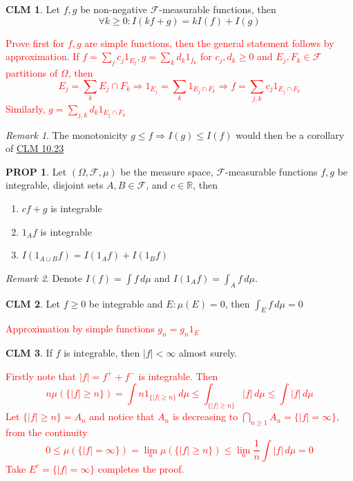 \documentclass[hidelinks]{article}
\theoremstyle{definition}
\theoremstyle{dotless}
\newtheorem{proposition}{PROP}[section]
\newtheorem{claim}{CLM}[section]
\theoremstyle{remark}
\newtheorem*{remark}{Remark}
\begin{document}
\begin{claim}\label{CLM 10.23}
Let $f,g$ be non-negative $\mathscr{F}$-measurable functions, then
\[\forall k\geq0:I(kf+g)=kI(f)+I(g)\]
\end{claim}
\textcolor{red}{Prove first for $f,g$ are simple functions, then the general statement follows by approximation.\newline
If $f=\sum\limits_jc_j1_{E_j},g=\sum\limits_kd_k1_{f_k}$ for $c_j,d_k\geq0$ and $E_j,F_k\in\mathscr{F}$ partitions of $\Omega$, then
\[E_j=\sum_kE_j\cap F_k\Rightarrow1_{E_j}=\sum_k1_{E_j\cap F_k}\Rightarrow f=\sum_{j,k}c_j1_{E_j\cap F_k}\]
Similarly, $g=\sum\limits_{j,k}d_k1_{E_j\cap F_k}$}

\begin{remark}
The monotonicity $g\leq f\Rightarrow I(g)\leq I(f)$ would then be a corollary of \hyperref[CLM 10.23]{CLM 10.23}
\end{remark}

\begin{proposition}
Let $(\Omega,\mathscr{F},\mu)$ be the measure space, $\mathscr{F}$-measurable functions $f,g$ be integrable, disjoint sets $A,B\in\mathscr{F}$, and $c\in\mathbb{R}$, then
\begin{enumerate}[label=\arabic*\degree]
    \item $cf+g$ is integrable
    \item $1_Af$ is integrable
    \item $I(1_{A\cup B}f)=I(1_Af)+I(1_Bf)$
\end{enumerate}
\end{proposition}

\begin{remark}
Denote $I(f)=\int f\,d\mu$ and $I(1_Af)=\int_A f\,d\mu$.
\end{remark}

\begin{claim}
Let $f\geq0$ be integrable and $E:\mu(E)=0$, then $\int_Ef\,d\mu=0$
\end{claim}
\textcolor{red}{Approximation by simple functions $g_n=g_n1_E$}

\begin{claim}\label{CLM 10.25}
If $f$ is integrable, then $|f|<\infty$ almost surely.
\end{claim}
\textcolor{red}{Firstly note that $|f|=f^++f^-$ is integrable. Then
\[n\mu(\{|f|\geq n\})=\int n1_{\{|f|\geq n\}}\,d\mu\leq\int_{\{|f|\geq n\}}|f|\,d\mu\leq\int|f|\,d\mu\]
Let $\{|f|\geq n\}=A_n$ and notice that $A_n$ is decreasing to $\bigcap\limits_{n\geq1}A_n=\{|f|=\infty\}$, from the continuity
\[0\leq\mu(\{|f|=\infty\})=\lim_n\mu(\{|f|\geq n\})\leq\lim_n\frac{1}{n}\int|f|\,d\mu=0\]
Take $E^c=\{|f|=\infty\}$ completes the proof.}
\end{document}
